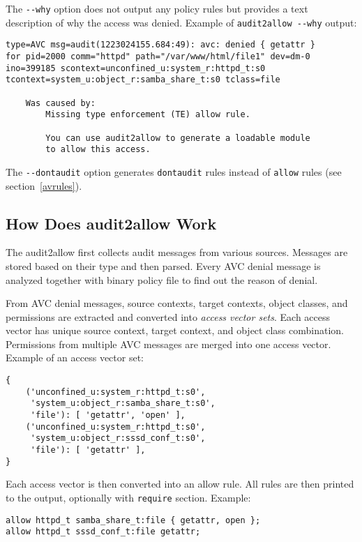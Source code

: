 The \texttt{-{}-why} option does not output any policy rules but provides a text
description of why the access was denied. Example of \texttt{audit2allow
-{}-why} output:
\begin{lstlisting}
type=AVC msg=audit(1223024155.684:49): avc: denied { getattr }
for pid=2000 comm="httpd" path="/var/www/html/file1" dev=dm-0
ino=399185 scontext=unconfined_u:system_r:httpd_t:s0
tcontext=system_u:object_r:samba_share_t:s0 tclass=file

    Was caused by:
        Missing type enforcement (TE) allow rule.

        You can use audit2allow to generate a loadable module
        to allow this access.
\end{lstlisting}

The \texttt{-{}-dontaudit} option generates \texttt{dontaudit} rules instead of
\texttt{allow} rules (see section~\ref{avrules}).

\subsection{How Does audit2allow Work}
The audit2allow first collects audit messages from various sources. Messages are
stored based on their type and then parsed. Every AVC denial message is analyzed
together with binary policy file to find out the reason of denial.

From AVC denial messages, source contexts, target contexts, object classes, and
permissions are extracted and converted into \emph{access vector sets}. Each
access vector has unique source context, target context, and object class
combination. Permissions from multiple AVC messages are merged into one access
vector. Example of an access vector set:
\begin{lstlisting}
{
    ('unconfined_u:system_r:httpd_t:s0',
     'system_u:object_r:samba_share_t:s0',
     'file'): [ 'getattr', 'open' ],
    ('unconfined_u:system_r:httpd_t:s0',
     'system_u:object_r:sssd_conf_t:s0',
     'file'): [ 'getattr' ],
}
\end{lstlisting}

Each access vector is then converted into an allow rule. All rules are then
printed to the output, optionally with \texttt{require} section. Example:
\begin{lstlisting}
allow httpd_t samba_share_t:file { getattr, open };
allow httpd_t sssd_conf_t:file getattr;
\end{lstlisting}

